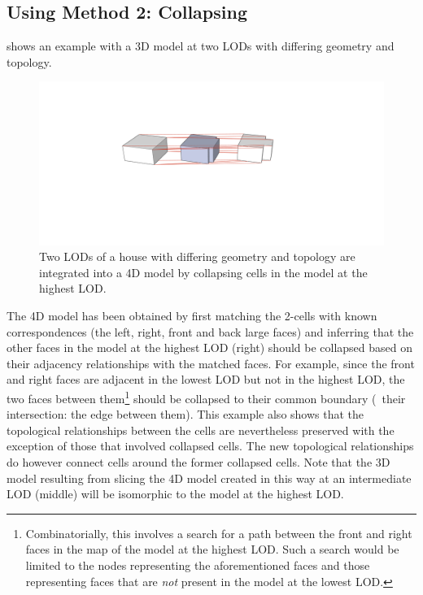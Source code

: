 \subsection{Using Method 2: Collapsing}

 shows an example with a 3D model at two LODs with differing geometry and topology.
\begin{figure}[tb]
   \centering
   \includegraphics[width=\linewidth]{figs/shape}
   \caption[Linking by collapsing]{Two LODs of a house with differing geometry and topology are integrated into a 4D model by collapsing cells in the model at the highest LOD.}
\label{fig:shape}
\end{figure}
The 4D model has been obtained by first matching the 2-cells with known correspondences (the left, right, front and back large faces) and inferring that the other faces in the model at the highest LOD (right) should be collapsed based on their adjacency relationships with the matched faces.
For example, since the front and right faces are adjacent in the lowest LOD but not in the highest LOD, the two faces between them\footnote{Combinatorially, this involves a search for a path between the front and right faces in the map of the model at the highest LOD.\@
Such a search would be limited to the nodes representing the aforementioned faces and those representing faces that are \emph{not} present in the model at the lowest LOD.} should be collapsed to their common boundary (\ie\ their intersection: the edge between them).
This example also shows that the topological relationships between the cells are nevertheless preserved with the exception of those that involved collapsed cells.
The new topological relationships do however connect cells around the former collapsed cells.
Note that the 3D model resulting from slicing the 4D model created in this way at an intermediate LOD (middle) will be isomorphic to the model at the highest LOD.\@


